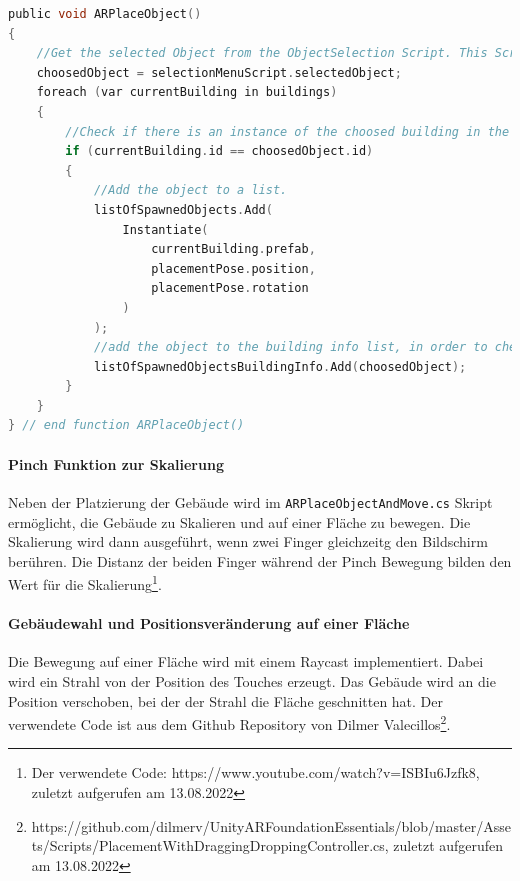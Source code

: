 \begin{lstlisting}[language=C,caption={Die \texttt{ARPlaceObject()} Funktion.},captionpos=b,label=lst:arplaceobject-funktion]
public void ARPlaceObject()
{
    //Get the selected Object from the ObjectSelection Script. This Script is attached to the UIManager.
    choosedObject = selectionMenuScript.selectedObject;
    foreach (var currentBuilding in buildings)
    {
        //Check if there is an instance of the choosed building in the scene.
        if (currentBuilding.id == choosedObject.id)
        {
            //Add the object to a list.
            listOfSpawnedObjects.Add(
                Instantiate(
                    currentBuilding.prefab,
                    placementPose.position,
                    placementPose.rotation
                )
            );
            //add the object to the building info list, in order to check earlier, if the building already exists
            listOfSpawnedObjectsBuildingInfo.Add(choosedObject);
        }
    }
} // end function ARPlaceObject()
\end{lstlisting}

\paragraph*{Pinch Funktion zur Skalierung}
Neben der Platzierung der Gebäude wird im \texttt{ARPlaceObjectAndMove.cs} Skript ermöglicht, die Gebäude zu Skalieren und auf einer Fläche zu bewegen. Die Skalierung wird dann ausgeführt, wenn zwei Finger gleichzeitg den Bildschirm berühren. Die Distanz der beiden Finger während der Pinch Bewegung bilden den Wert für die Skalierung\footnote{Der verwendete Code: https://www.youtube.com/watch?v=ISBIu6Jzfk8, zuletzt aufgerufen am 13.08.2022}.

\paragraph*{Gebäudewahl und Positionsveränderung auf einer Fläche}
Die Bewegung auf einer Fläche wird mit einem Raycast implementiert. Dabei wird ein Strahl von der Position des Touches erzeugt. Das Gebäude wird an die Position verschoben, bei der der Strahl die Fläche geschnitten hat. Der verwendete Code ist aus dem Github Repository von Dilmer Valecillos\footnote{https://github.com/dilmerv/UnityARFoundationEssentials/blob/master/Assets/Scripts/PlacementWithDraggingDroppingController.cs, zuletzt aufgerufen am 13.08.2022}.

